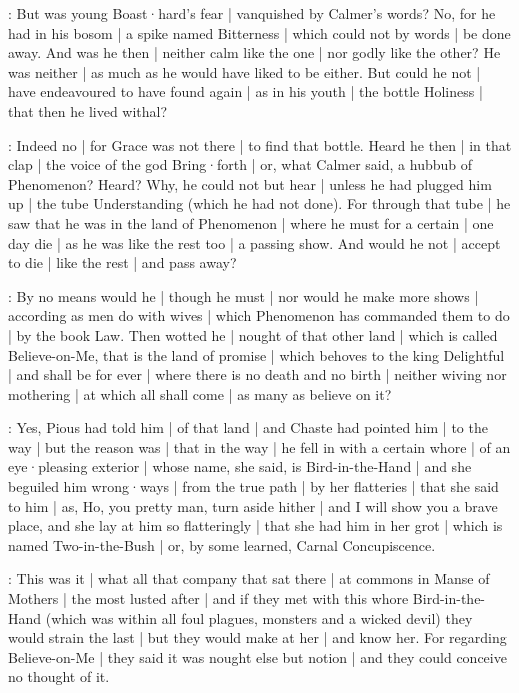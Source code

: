 :
But was young Boast·hard's fear |
vanquished by Calmer's words?
No,
for he had in his bosom |
a spike named Bitterness |
which could not by words |
be done away.
And was he then |
neither calm like the one |
nor godly like the other?
He was neither |
as much as he would have liked to be either.
But could he not |
have endeavoured to have found again |
as in his youth |
the bottle Holiness |
that then he lived withal?

:
Indeed no |
for Grace was not there |
to find that bottle.
Heard he then |
in that clap |
the voice of the god Bring·forth |
or,
what Calmer said,
a hubbub of Phenomenon?
Heard?
Why,
he could not but hear |
unless he had plugged him up |
the tube Understanding
(which he had not done).
For through that tube |
he saw that he was in the land of Phenomenon |
where he must for a certain |
one day die |
as he was like the rest too |
a passing show.
And would he not |
accept to die |
like the rest |
and pass away?

:
By no means would he |
though he must |
nor would he make more shows |
according as men do with wives |
which Phenomenon has commanded them to do |
by the book Law.
Then wotted he |
nought of that other land |
which is called Believe-on-Me,
that is the land of promise |
which behoves to the king Delightful |
and shall be for ever |
where there is no death and no birth |
neither wiving nor mothering |
at which all shall come |
as many as believe on it?

:
Yes,
Pious had told him |
of that land |
and Chaste had pointed him |
to the way |
but the reason was |
that in the way |
he fell in with a certain whore |
of an eye·pleasing exterior |
whose name,
she said,
is Bird-in-the-Hand |
and she beguiled him wrong·ways |
from the true path |
by her flatteries |
that she said to him |
as,
Ho,
you pretty man,
turn aside hither |
and I will show you a brave place,
and she lay at him so flatteringly |
that she had him in her grot |
which is named Two-in-the-Bush |
or,
by some learned,
Carnal Concupiscence.


:
This was it |
what all that company that sat there |
at commons in Manse of Mothers |
the most lusted after |
and if they met with this whore Bird-in-the-Hand
(which was within all foul plagues,
monsters and a wicked devil)
they would strain the last |
but they would make at her |
and know her.
For regarding Believe-on-Me |
they said it was nought else but notion |
and they could conceive no thought of it.

